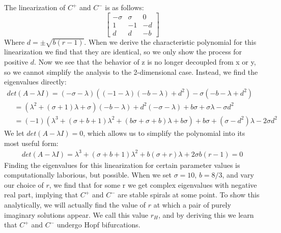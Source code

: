 \documentclass{report}
\begin{document}
The linearization of \(C^+\) and \(C^-\) is as follows:
\[
\begin{bmatrix}
   -\sigma & \sigma & 0 \\
   1 & -1 & -d \\
   d & d & -b
\end{bmatrix}
\]
Where \(d = \pm \sqrt{b(r-1)}\). When we derive the characteristic polynomial 
for this linearization we find that they are identical, so we only show the
process for positive \(d\). Now we see that the behavior of z is no longer
decoupled from x or y, so we cannot simplify the analysis to the 2-dimensional
case. Instead, we find the eigenvalues directly:
\begin{align*}
  det(A-\lambda I) = (-\sigma-\lambda)((-1-\lambda)(-b-\lambda)+d^2 )-
  \sigma(-b-\lambda+d^2) \\
  \quad = (\lambda^2 +(\sigma+1)\lambda+\sigma)(-b-\lambda)+
d^2(-\sigma-\lambda)+b\sigma+\sigma\lambda-\sigma d^2 \\
  \quad = (-1)(\lambda^3 +(\sigma + b + 1)\lambda^2 +(b\sigma+\sigma+b)\lambda
+b\sigma)+b\sigma+(\sigma-d^2)\lambda-2\sigma d^2
\end{align*}
We let \(det(A-\lambda I) = 0\), which allows us to simplify the polynomial
into its most useful form:
\begin{align*}
  det(A-\lambda I) = \lambda^3 + (\sigma+b+1)\lambda^2 + b(\sigma+r)\lambda
+ 2\sigma b(r-1) = 0
\end{align*}
Finding the eigenvalues for this linearization for certain parameter values
is computationally laborious, but possible. When we set \(\sigma = 10\),
\(b=8/3\), and vary our choice of \(r\), we find that for some r we get
complex eigenvalues with negative real part, implying that \(C^+\) and \(C^-\)
are stable spirals at some point. To show this analytically, we will actually
find the value of \(r\) at which a pair of purely imaginary solutions appear.
We call this value \(r_H\), and by deriving this we learn that \(C^+\) and
\(C^-\) undergo Hopf bifurcations. 
\end{document}
